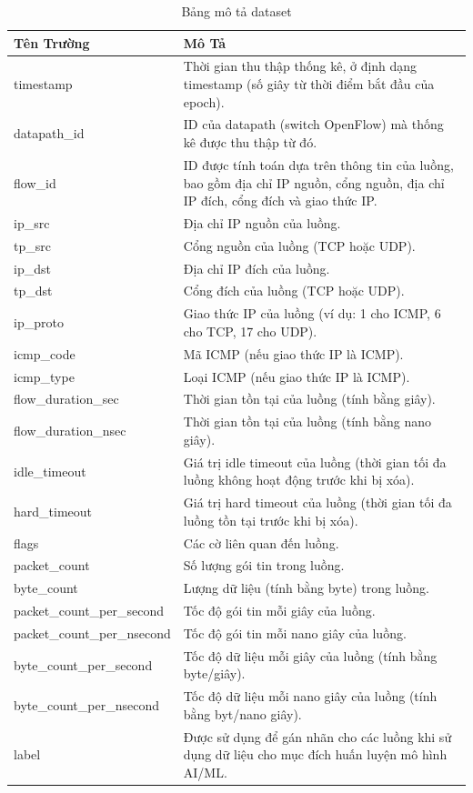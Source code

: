 \documentclass[a4paper]{article}
\begin{document}
\begin{table}[H]
\centering
\caption{Bảng mô tả dataset\cite{chiragbiradar}}
\label{tab:dataset}
\addvspace{0.3cm}
\begin{tabular}{|p{5.5cm}|p{9.5cm}|}
\hline
\textbf{Tên Trường} & \textbf{Mô Tả} \\ \hline
timestamp & Thời gian thu thập thống kê, ở định dạng timestamp (số giây từ thời điểm bắt đầu của epoch). \\ \hline
datapath\_id & ID của datapath (switch OpenFlow) mà thống kê được thu thập từ đó. \\ \hline
flow\_id & ID được tính toán dựa trên thông tin của luồng, bao gồm địa chỉ IP nguồn, cổng nguồn, địa chỉ IP đích, cổng đích và giao thức IP. \\ \hline
ip\_src & Địa chỉ IP nguồn của luồng. \\ \hline
tp\_src & Cổng nguồn của luồng (TCP hoặc UDP). \\ \hline
ip\_dst & Địa chỉ IP đích của luồng. \\ \hline
tp\_dst & Cổng đích của luồng (TCP hoặc UDP). \\ \hline
ip\_proto & Giao thức IP của luồng (ví dụ: 1 cho ICMP, 6 cho TCP, 17 cho UDP). \\ \hline
icmp\_code & Mã ICMP (nếu giao thức IP là ICMP). \\ \hline
icmp\_type & Loại ICMP (nếu giao thức IP là ICMP). \\ \hline
flow\_duration\_sec & Thời gian tồn tại của luồng (tính bằng giây). \\ \hline
flow\_duration\_nsec & Thời gian tồn tại của luồng (tính bằng nano giây). \\ \hline
idle\_timeout & Giá trị idle timeout của luồng (thời gian tối đa luồng không hoạt động trước khi bị xóa). \\ \hline
hard\_timeout & Giá trị hard timeout của luồng (thời gian tối đa luồng tồn tại trước khi bị xóa). \\ \hline
flags & Các cờ liên quan đến luồng. \\ \hline
packet\_count & Số lượng gói tin trong luồng. \\ \hline
byte\_count & Lượng dữ liệu (tính bằng byte) trong luồng. \\ \hline
packet\_count\_per\_second & Tốc độ gói tin mỗi giây của luồng. \\ \hline
packet\_count\_per\_nsecond & Tốc độ gói tin mỗi nano giây của luồng. \\ \hline
byte\_count\_per\_second & Tốc độ dữ liệu mỗi giây của luồng (tính bằng byte/giây). \\ \hline
byte\_count\_per\_nsecond & Tốc độ dữ liệu mỗi nano giây của luồng (tính bằng byt/nano giây). \\ \hline
label & Được sử dụng để gán nhãn cho các luồng khi sử dụng dữ liệu cho mục đích huấn luyện mô hình AI/ML. \\ \hline
\end{tabular}
\end{table}
\end{document}

